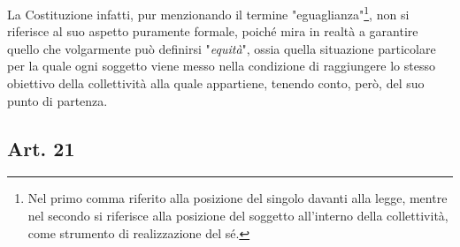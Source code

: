 La Costituzione infatti, pur menzionando il termine "eguaglianza"\footnote{Nel primo comma riferito alla posizione del singolo davanti alla legge, mentre nel secondo si riferisce alla posizione del soggetto all'interno della collettività, come strumento di realizzazione del sé.}, non si riferisce al suo aspetto puramente formale, poiché mira in realtà a garantire quello che volgarmente può definirsi "\textit{equità}", ossia quella situazione particolare per la quale ogni soggetto viene messo nella condizione di raggiungere lo stesso obiettivo della collettività alla quale appartiene, tenendo conto, però, del suo punto di partenza.






\subsection{Art. 21}

